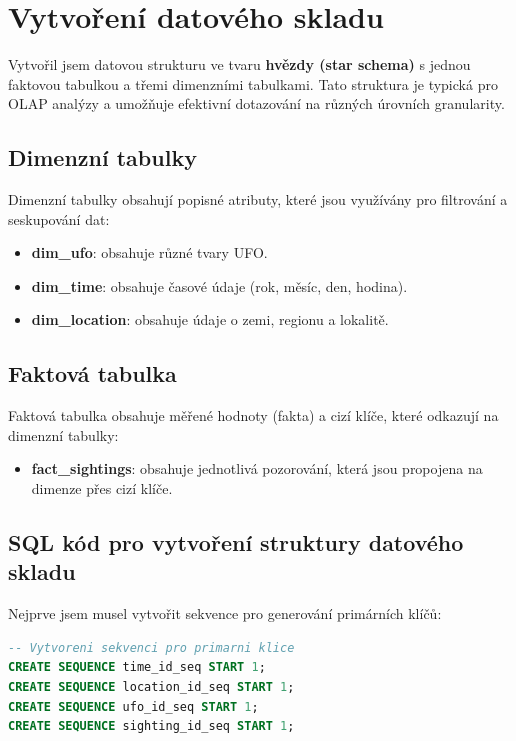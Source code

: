 \documentclass[a4paper,12pt]{article}
\begin{document}
\section{Vytvoření datového skladu}
Vytvořil jsem datovou strukturu ve tvaru \textbf{hvězdy (star schema)} s jednou faktovou tabulkou a třemi dimenzními tabulkami. Tato struktura je typická pro OLAP analýzy a umožňuje efektivní dotazování na různých úrovních granularity.

\subsection{Dimenzní tabulky}
Dimenzní tabulky obsahují popisné atributy, které jsou využívány pro filtrování a seskupování dat:

\begin{itemize}
    \item \textbf{dim\_ufo}: obsahuje různé tvary UFO.
    \item \textbf{dim\_time}: obsahuje časové údaje (rok, měsíc, den, hodina).
    \item \textbf{dim\_location}: obsahuje údaje o zemi, regionu a lokalitě.
\end{itemize}

\subsection{Faktová tabulka}
Faktová tabulka obsahuje měřené hodnoty (fakta) a cizí klíče, které odkazují na dimenzní tabulky:

\begin{itemize}
    \item \textbf{fact\_sightings}: obsahuje jednotlivá pozorování, která jsou propojena na dimenze přes cizí klíče.
\end{itemize}

\subsection{SQL kód pro vytvoření struktury datového skladu}
Nejprve jsem musel vytvořit sekvence pro generování primárních klíčů:

\begin{lstlisting}[language=sql, caption=Vytvoření sekvencí]
-- Vytvoreni sekvenci pro primarni klice
CREATE SEQUENCE time_id_seq START 1;
CREATE SEQUENCE location_id_seq START 1;
CREATE SEQUENCE ufo_id_seq START 1;
CREATE SEQUENCE sighting_id_seq START 1;
\end{lstlisting}
\end{document}
